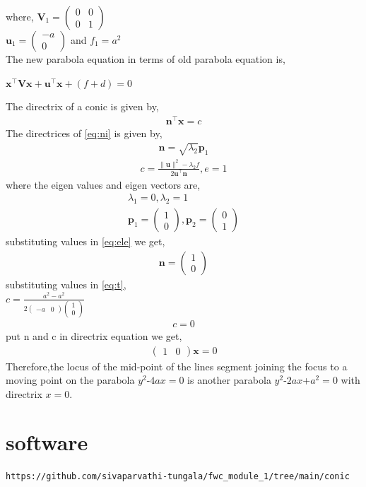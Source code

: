 \documentclass[journal,12pt,twocolumn]{IEEEtran}
\newcommand{\myvec}[1]{\ensuremath{\begin{pmatrix}#1\end{pmatrix}}}
\let\vec\mathbf
\begin{document}
where,
$\vec{V}_{1}=\myvec{0&0 \\0&1}$\\ $\vec{u}_{1}=\myvec{-a\\0}$ and $f_1=a^2$ \\
The new parabola equation in terms of old parabola equation is,\\
\begin{center}
$\vec{x}^\top\vec{V}\vec{x}+\vec{u}^\top\vec{x}+(f+d)=0$
\end{center}
The directrix of a conic is given by,
\begin{align}
\label{eq:te}
\vec{n}^\top\vec{x}=c
\end{align}
The directrices of \eqref{eq:ni} is given by,\\
\begin{align}
\label{eq:ele}
\vec{n}=\sqrt{\lambda_2}\vec{p}_{1}
\end{align}
\begin{align}
\label{eq:t}
c=\frac{\|\vec{u}\|^2-\lambda_2 f}{2\vec{u}^\top\vec{n}} , e=1
\end{align}
where the eigen values and eigen vectors are,\\
\begin{align}
\label{eq:twe}
\lambda_1=0 , \lambda_2=1\\
\vec{p}_{1}=\myvec{1\\0}, \vec{p}_{2}=\myvec{0\\1} 
\end{align}
substituting values in \eqref{eq:ele} we get,\\
\begin{align}
\label{eq:thir}
\vec{n}=\myvec{1\\0}
\end{align}
substituting values in \eqref{eq:t},\\
$c=\frac{a^2-a^2}{2\myvec{-a & 0}\myvec{1\\0}}$\\
\begin{align}
\label{eq:fourteen}
c=0
\end{align}
put n and c in directrix equation we get,
\begin{align}
\label{eq:fif}
\myvec{1&0}\vec{x}=0
\end{align}
        Therefore,the locus of the mid-point of the lines segment joining the focus to a moving point on the parabola $y^2$-$4ax=0$ is another parabola $y^2$-$2ax$+$a^2=0$ with directrix $x=0$.\\



\section{\textbf{software}}
\begin{lstlisting}
https://github.com/sivaparvathi-tungala/fwc_module_1/tree/main/conic
\end{lstlisting}
\end{document}
